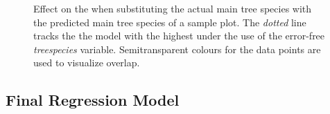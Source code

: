 \begin{figure}[h]
	\centering
	\caption{Effect on the \adjrsq{} when substituting the actual main tree species with the predicted  main tree species of a sample plot. The \textit{dotted} line tracks the the model with the highest \adjrsq{} under the use of the error-free \textit{treespecies} variable. Semitransparent colours for the data points are used to visualize overlap.}
	\label{fig:supp_r2_calnocal}
\end{figure}


\subsection{Final Regression Model}
\label{sec:regmod_final}

